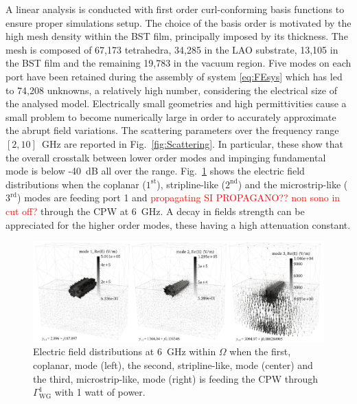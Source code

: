 \documentclass[AMA,STIX2COL]{WileyNJD-v2}
\begin{document}
A linear analysis is conducted with first order curl-conforming basis functions to ensure proper simulations setup. The choice of the basis order is motivated by the high mesh density within the BST film, principally imposed by its thickness. The mesh is composed of 67,173 tetrahedra, 34,285 in the LAO substrate, 13,105 in the BST film and the remaining 19,783 in the vacuum region. Five modes on each port have been retained during the assembly of system \eqref{eq:FEsys} which has led to 74,208 unknowns, a relatively high number, considering the electrical size of the analysed model. Electrically small geometries and high permittivities cause a small problem to become numerically large in order to accurately approximate the abrupt field variations. The scattering parameters  over the frequency range $[2,10]$~GHz are reported in Fig.~\ref{fig:Scattering}. In particular, these show that the overall crosstalk between lower order modes and impinging fundamental mode is below -40~dB all over the range. Fig.~\ref{fig:fields} shows the electric field distributions when the coplanar ($1^\text{st}$), stripline-like ($2^\text{nd}$) and the microstrip-like ($3^\text{rd}$)  modes are feeding port 1 and \textcolor{red}{propagating SI PROPAGANO?? non sono in cut off?} through the CPW at 6~GHz. A decay in fields strength can be appreciated for the higher order modes, these having a high attenuation constant.
%
\begin{figure}[t!]
\centering
\includegraphics[width=\textwidth]{fields}
\caption{Electric field distributions at 6~GHz within $\Omega$ when the first, coplanar, mode (left), the second, stripline-like, mode (center) and the third, microstrip-like, mode (right) is feeding the CPW through $\Gamma^1_\text{WG}$ with 1 watt of power. }
\label{fig:fields}
\end{figure}
\end{document}
